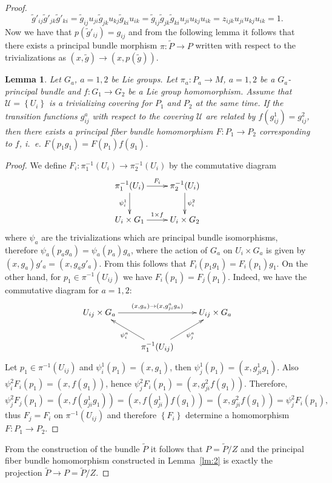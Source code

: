 \documentclass[12pt,letterpaper]{amsart}
\theoremstyle{definition}
\theoremstyle{plain}
\newtheorem{lm}{Lemma}
\theoremstyle{remark}
\begin{document}
\begin{proof}
\begin{equation}
\widetilde{g}'_{ij} \widetilde{g}'_{jk} \widetilde{g}'_{ki} =\widetilde{g}_{ij} u_{ji} \widetilde{g}_{jk} u_{kj} \widetilde{g}_{ki} u_{ik} =\widetilde{g}_{ij} \widetilde{g}_{jk} \widetilde{g}_{ki} u_{ji} u_{kj} u_{ik} =
z_{ijk} u_{ji} u_{kj} u_{ik} = 1.
\label{eq:58}
\end{equation}
Now we have that $p(\widetilde{g}'_{ij}) = g_{ij}$ and from the following lemma it follows that there exists a principal bundle morphism $\pi : \widetilde{P} \to P$ written with respect to the trivializations as $(x, \widetilde{g}) \to (x, p(\widetilde{g}))$.
\begin{lm}
Let $G_a$, $a = 1, 2$ be Lie groups.
Let $\pi_a : P_a \to M$, $a = 1, 2$ be a $G_a$-principal bundle and $f : G_1 \to G_2$ be a Lie group homomorphism.
Assume that $\mathcal{U} = \left\{ U_i \right\}$ is a trivializing covering for $P_1$ and $P_2$ at the same time.
If the transition functions $g^a_{ij}$ with respect to the covering $\mathcal{U}$ are related by $f(g^1_{ij}) = g^2_{ij}$, then there exists a principal fiber bundle homomorphism $F : P_1 \to P_2$ corresponding to $f$, i.\, e. $F(p_1 g_1) = F(p_1) f(g_1)$.
\label{lm:1}
\end{lm}
\begin{proof}
We define $F_i : \pi_1^{-1}(U_i) \to \pi_2^{-1}(U_i)$ by the commutative diagram
\begin{equation}
\xymatrix{%
\pi_1^{-1}(U_i) \ar[r]^{F_i} \ar[d]_{\psi_i^1} & \pi_2^{-1}(U_i) \ar[d]^{\psi_i^2}
\\
U_i \times G_1 \ar[r]^{ 1 \times f} & U_i \times G_2%
}
\label{eq:59}
\end{equation}
where $\psi_a$ are the trivializations which are principal bundle isomorphisms, therefore $\psi_a(p_a g_a) = \psi_a(p_a) g_a$, where the action of $G_a$ on $U_i \times G_a$ is given by $(x, g_a) g'_a = (x, g_a g'_a)$.
From this follows that $F_i(p_1 g_1) = F_i(p_1) g_1$.
On the other hand, for $p_1 \in \pi^{-1}(U_{ij})$ we have $F_i(p_1) = F_j(p_1)$.
Indeed, we have the commutative diagram for $a = 1, 2$:
\begin{equation}
\xymatrix{%
U_{ij} \times G_a{}\ar[rr]^{(x, g_a) \to (x, g^a_{ji} g_a)} & & U_{ij} \times G_a
\\
&\pi_1^{-1}(U_{ij}) \ar[lu]^{\psi^a_i} \ar[ru]_{\psi^a_j} &%
}
\label{eq:60}
\end{equation}
Let $p_1 \in \pi^{-1}(U_{ij})$ and $\psi^1_i(p_1) = (x, g_1)$, then $\psi^1_j(p_1) = (x, g^1_{ji} g_1)$.
Also $\psi^2_i F_i(p_1) = (x, f(g_1))$, hence $\psi^2_j F_i(p_1) = (x, g^2_{ji} f(g_1))$.
Therefore,
\begin{equation}
\psi^2_j F_j(p_1) = (x, f(g^1_{ji} g_1)) = (x, f(g^1_{ji}) f(g_1))
= (x, g^2_{ji} f(g_1)) = \psi^2_j F_i(p_1),
\label{eq:61}
\end{equation}
thus $F_j = F_i$ on $\pi^{-1}(U_{ij})$ and therefore $\left\{ F_i \right\}$ determine a homomorphism $F : P_1 \to P_2$.
\end{proof}
From the construction of the bundle $\widetilde{P}$ it follows that $P = \widetilde{P}/Z$ and the principal fiber bundle homomorphism constructed in Lemma~\ref{lm:2} is exactly the projection $\widetilde{P} \to P=\widetilde{P}/Z$.
\end{proof}
\end{document}
